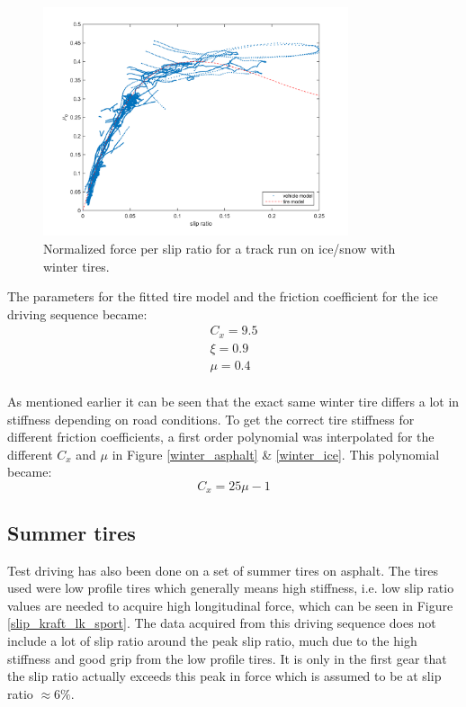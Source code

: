 \begin{figure}[h]
	\centering
	\includegraphics[width=0.8\textwidth]{Pictures/slip_kraft_is}
	\caption {Normalized force per slip ratio for a track run on ice/snow with winter tires.}
	\label{slip_kraft_is}
\end{figure}

The parameters for the fitted tire model and the friction coefficient for the ice driving sequence became:
\begin{equation}
\label{winter_ice}
\begin{split}
C_{x} = 9.5 \\
\xi = 0.9 \\
\mu = 0.4 \\
\end{split}
\end{equation}

As mentioned earlier it can be seen that the exact same winter tire differs a lot in stiffness depending on road conditions. To get the correct tire stiffness for different friction coefficients, a first order polynomial was interpolated for the different $ C_{x} $ and $ \mu $ in Figure \ref{winter_asphalt} \& \ref{winter_ice}. This polynomial became:
\begin{equation}
	C_{x} = 25\mu - 1
\end{equation}

\subsection{Summer tires}
\label{summer_tire}
Test driving has also been done on a set of summer tires on asphalt. The tires used were low profile tires which generally means high stiffness, i.e. low slip ratio values are needed to acquire high longitudinal force, which can be seen in Figure \ref{slip_kraft_lk_sport}. The data acquired from this driving sequence does not include a lot of slip ratio around the peak slip ratio, much due to the high stiffness and good grip from the low profile tires. It is only in the first gear that the slip ratio actually exceeds this peak in force which is assumed to be at slip ratio $ \approx 6 \% $.

